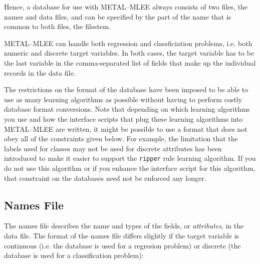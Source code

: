 \documentclass[a4paper,10pt,twoside]{article}
\newcommand{\eenameshort}{\textsf{METAL--MLEE}}
\begin{document}
Hence, a database for use with \eenameshort{} always consists
of two files, the names and data files, and can be specified
by the part of the name that is common to both files, the
filestem.

\eenameshort{} can handle both regression and classficiation
problems, i.e. both numeric and discrete target variables.
In both cases, the target variable has to be the last variable
in the comma-separated list of fields that make up the individual
records in the data file.

The restrictions on the format of the database have been imposed to
be able to use as many learning algorithms as possible without
having to perform costly database format conversions. Note that 
depending on which learning algorithms you use and how the 
interface scripts that plug these learning algorithms into 
\eenameshort{} are written, it might be possible to use a format
that does not obey all of the constraints given below. For
example,
the limitation that the labels used for classes may not be
used for discrete attributes has been introduced to make it
easier to support the \texttt{ripper} rule learning algorithm.
If you do not use this algorithm or if you enhance the interface
script for this algorithm, that constraint on the databases need
not be enforced any longer.


\subsection{Names File}

The names file describes the name and types of the fields, 
or \emph{attributes}, 
in the data file. The format of the names file differs slightly
if the target variable is continuous (i.e. the database 
is used for a regresion problem) or discrete (the database 
is used for a classification problem):
\end{document}

